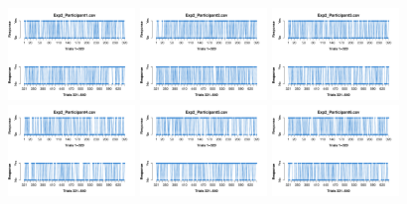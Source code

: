 \begin{figure}[th]
\centering
\includegraphics[width=0.30\textwidth]{Figures/Response_Exp2_P1} \includegraphics[width=0.30\textwidth]{Figures/Response_Exp2_P2} \includegraphics[width=0.30\textwidth]{Figures/Response_Exp2_P3}
\includegraphics[width=0.30\textwidth]{Figures/Response_Exp2_P4} \includegraphics[width=0.30\textwidth]{Figures/Response_Exp2_P5} \includegraphics[width=0.30\textwidth]{Figures/Response_Exp2_P6}

\end{figure}

